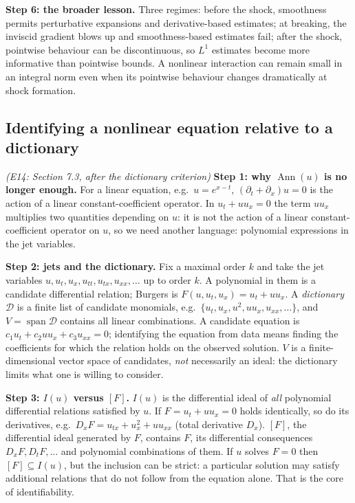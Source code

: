 \documentclass[11pt]{article}
\theoremstyle{plain}
\theoremstyle{definition}
\theoremstyle{remark}
\DeclareMathOperator{\Ann}{Ann}             %
\DeclareMathOperator{\spn}{span}
\begin{document}
\medskip\textbf{Step 6: the broader lesson.} Three regimes: before the shock, smoothness permits perturbative expansions and derivative-based estimates; at breaking, the inviscid gradient blows up and smoothness-based estimates fail; after the shock, pointwise behaviour can be discontinuous, so $L^1$ estimates become more informative than pointwise bounds. A nonlinear interaction can remain small in an integral norm even when its pointwise behaviour changes dramatically at shock formation.

\subsection{Identifying a nonlinear equation relative to a dictionary}\label{expl:E14}
\noindent\emph{(E14: Section 7.3, after the dictionary criterion)}
\textbf{Step 1: why $\Ann(u)$ is no longer enough.} For a linear equation, e.g.\ $u=e^{x-t}$, $(\partial_t+\partial_x)u=0$ is the action of a linear constant-coefficient operator. In $u_t+uu_x=0$ the term $uu_x$ multiplies two quantities depending on $u$: it is not the action of a linear constant-coefficient operator on $u$, so we need another language: polynomial expressions in the jet variables.

\medskip\textbf{Step 2: jets and the dictionary.} Fix a maximal order $k$ and take the jet variables $u,u_t,u_x,u_{tt},u_{tx},u_{xx},\dots$ up to order $k$. A polynomial in them is a candidate differential relation; Burgers is $F(u,u_t,u_x)=u_t+uu_x$. A \emph{dictionary} $\mathcal D$ is a finite list of candidate monomials, e.g.\ $\{u_t,u_x,u^2,uu_x,u_{xx},\dots\}$, and $V=\spn\mathcal D$ contains all linear combinations. A candidate equation is $c_1u_t+c_2uu_x+c_3u_{xx}=0$; identifying the equation from data means finding the coefficients for which the relation holds on the observed solution. $V$ is a finite-dimensional vector space of candidates, \emph{not} necessarily an ideal: the dictionary limits what one is willing to consider.

\medskip\textbf{Step 3: $I(u)$ versus $[F]$.} $I(u)$ is the differential ideal of \emph{all} polynomial differential relations satisfied by $u$. If $F=u_t+uu_x=0$ holds identically, so do its derivatives, e.g.\ $D_xF=u_{tx}+u_x^2+uu_{xx}$ (total derivative $D_x$). $[F]$, the differential ideal generated by $F$, contains $F$, its differential consequences $D_xF,D_tF,\dots$ and polynomial combinations of them. If $u$ solves $F=0$ then $[F]\subseteq I(u)$, but the inclusion can be strict: a particular solution may satisfy additional relations that do not follow from the equation alone. That is the core of identifiability.
\end{document}
